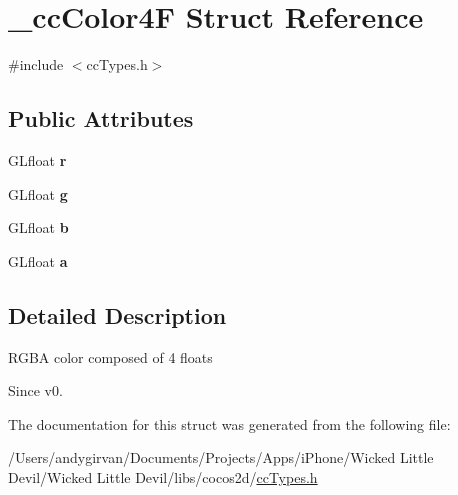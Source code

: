 \hypertarget{struct__cc_color4_f}{\section{\-\_\-cc\-Color4\-F Struct Reference}
\label{struct__cc_color4_f}
}


{\ttfamily \#include $<$cc\-Types.\-h$>$}

\subsection*{Public Attributes}
\begin{DoxyCompactItemize}
\item 
\hypertarget{struct__cc_color4_f_a5de3aa7ad1663a8ec2475afe19b4ab3d}{G\-Lfloat {\bfseries r}}\label{struct__cc_color4_f_a5de3aa7ad1663a8ec2475afe19b4ab3d}

\item 
\hypertarget{struct__cc_color4_f_a6c6a1f945462e41b82ef75cb7f8d9c08}{G\-Lfloat {\bfseries g}}\label{struct__cc_color4_f_a6c6a1f945462e41b82ef75cb7f8d9c08}

\item 
\hypertarget{struct__cc_color4_f_a9ea1fc40f98fce7e6a02af1eddda70d5}{G\-Lfloat {\bfseries b}}\label{struct__cc_color4_f_a9ea1fc40f98fce7e6a02af1eddda70d5}

\item 
\hypertarget{struct__cc_color4_f_acdcbdf3965687c19a25403990e4513be}{G\-Lfloat {\bfseries a}}\label{struct__cc_color4_f_acdcbdf3965687c19a25403990e4513be}

\end{DoxyCompactItemize}


\subsection{Detailed Description}
\begin{DoxyVerb}RGBA color composed of 4 floats
\end{DoxyVerb}
 \begin{DoxySince}{Since}
v0. 
\end{DoxySince}


The documentation for this struct was generated from the following file\-:\begin{DoxyCompactItemize}
\item 
/\-Users/andygirvan/\-Documents/\-Projects/\-Apps/i\-Phone/\-Wicked Little Devil/\-Wicked Little Devil/libs/cocos2d/\hyperlink{cc_types_8h}{cc\-Types.\-h}\end{DoxyCompactItemize}
